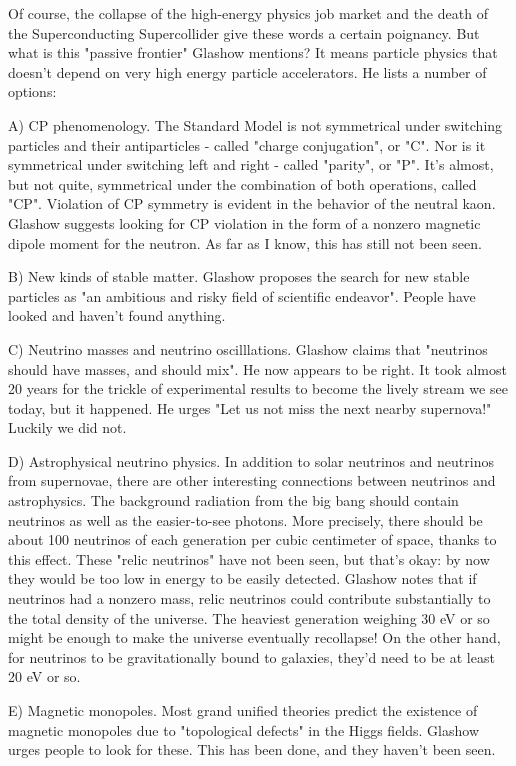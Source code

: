 Of course, the collapse of the high-energy physics job market and the
death of the Superconducting Supercollider give these words a certain
poignancy.  But what is this "passive frontier" Glashow mentions?  It
means particle physics that doesn't depend on very high energy particle
accelerators.  He lists a number of options:

A) CP phenomenology.  The Standard Model is not symmetrical under
switching particles and their antiparticles - called "charge
conjugation", or "C".  Nor is it symmetrical under
switching left and right - called "parity", or "P".
It's almost, but not quite, symmetrical under the combination of both
operations, called "CP".  Violation of CP symmetry is evident
in the behavior of the neutral kaon.  Glashow suggests looking for CP
violation in the form of a nonzero magnetic dipole moment for the
neutron.  As far as I know, this has still not been seen.

B) New kinds of stable matter.  Glashow proposes the search for new
stable particles as "an ambitious and risky field of scientific
endeavor".  People have looked and haven't found anything.

C) Neutrino masses and neutrino oscilllations.  Glashow claims that
"neutrinos should have masses, and should mix".  He now appears to 
be right.  It took almost 20 years for the trickle of experimental
results to become the lively stream we see today, but it happened.
He urges "Let us not miss the next nearby supernova!"  Luckily we
did not.

D) Astrophysical neutrino physics.  In addition to solar neutrinos and
neutrinos from supernovae, there are other interesting connections
between neutrinos and astrophysics.  The background radiation from the
big bang should contain neutrinos as well as the easier-to-see photons.
More precisely, there should be about 100 neutrinos of each generation
per cubic centimeter of space, thanks to this effect.  These "relic
neutrinos" have not been seen, but that's okay: by now they would be too
low in energy to be easily detected.   Glashow notes that if neutrinos
had a nonzero mass, relic neutrinos could contribute substantially to
the total density of the universe.  The heaviest generation weighing 30
eV or so might be enough to make the universe eventually recollapse! On
the other hand, for neutrinos to be gravitationally bound to galaxies,
they'd need to be at least 20 eV or so.   

E) Magnetic monopoles.  Most grand unified theories predict the
existence of magnetic monopoles due to "topological defects"
in the Higgs fields.  Glashow urges people to look for these.  This has
been done, and they haven't been seen.

